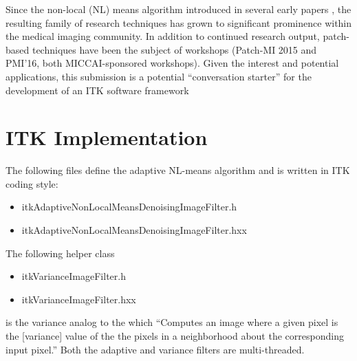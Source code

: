 \documentclass{InsightArticle}
\begin{document}
Since the non-local (NL) means algorithm introduced in several early papers \cite{Buades},
the resulting family of research techniques has grown to significant prominence within the
medical imaging community.  In addition to continued research output, patch-based techniques
have been the subject of workshops (Patch-MI 2015 and PMI'16, both MICCAI-sponsored
workshops).   Given the interest and potential applications, this submission is a potential
``conversation starter'' for the development of an ITK software framework

\section{ITK Implementation}

The following files define the adaptive NL-means algorithm and is written in ITK
coding style:
\begin{itemize}
  \item itkAdaptiveNonLocalMeansDenoisingImageFilter.h
  \item itkAdaptiveNonLocalMeansDenoisingImageFilter.hxx
\end{itemize}
The following helper class
\begin{itemize}
  \item itkVarianceImageFilter.h
  \item itkVarianceImageFilter.hxx
\end{itemize}
is the variance analog to the  which ``Computes an image where a
given pixel is the [variance] value of the the pixels in a neighborhood about the corresponding
input pixel.''  Both the adaptive and variance filters are multi-threaded.
\end{document}
